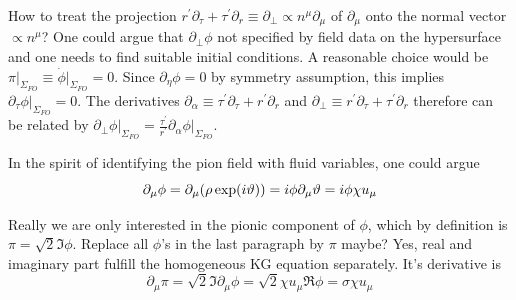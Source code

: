 How to treat the projection $r^\prime\partial_\tau+\tau^\prime\partial_r\equiv\partial_\perp\propto n^\mu\partial_\mu$ of $\partial_\mu$ onto the normal vector $\propto n^\mu$? One could argue that $\partial_\perp\phi$ not specified by field data on the hypersurface and one needs to find suitable initial conditions. A reasonable choice would be $\pi\vert_{\Sigma_{FO}}\equiv\dot{\phi}\vert_{\Sigma_{FO}}=0$. Since $\partial_\eta\phi=0$ by symmetry assumption, this implies $\partial_\tau\phi\vert_{\Sigma_{FO}}=0$. The derivatives $\partial_\alpha\equiv\tau^\prime\partial_\tau+r^\prime\partial_r$ and $\partial_\perp\equiv r^\prime\partial_\tau+\tau^\prime\partial_r$ therefore can be related by $\partial_\perp\phi\vert_{\Sigma_{FO}}=\frac{\tau^\prime}{r^\prime}\partial_\alpha\phi\vert_{\Sigma_{FO}}$.

In the spirit of identifying the pion field with fluid variables, one could argue
\begin{equation}
    \partial_\mu\phi=\partial_\mu(\rho\exp({i}\vartheta))={i}\phi\partial_\mu\vartheta={i}\phi\chi u_\mu
\end{equation}

Really we are only interested in the pionic component of $\phi$, which by definition is $\pi=\sqrt{2}\Im\phi$. Replace all $\phi$'s in the last paragraph by $\pi$ maybe? Yes, real and imaginary part fulfill the homogeneous KG equation separately. It's derivative is
\begin{equation}
    \partial_\mu\pi=\sqrt{2}\Im\partial_\mu\phi=\sqrt{2}\chi u_\mu\Re\phi=\sigma\chi u_\mu
\end{equation}
